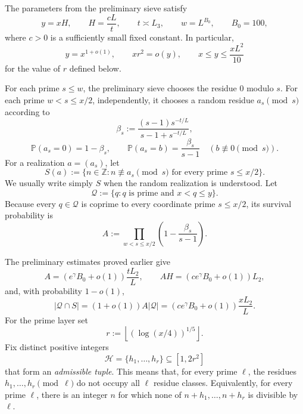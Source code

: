 \documentclass[10pt,letterpaper]{article}
\newcommand{\PP}{\mathbb{P}}
\newcommand{\ZZ}{\mathbb{Z}}
\newcommand{\HH}{\mathcal{H}}
\newcommand{\QQ}{\mathcal{Q}}
\begin{document}
The parameters from the preliminary sieve satisfy
\begin{equation}
y=xH,\qquad H=\frac{cL}{t},\qquad t\asymp L_3,\qquad w=L^{B_0},\qquad B_0=100,
\tag{6.2}
\end{equation}
where $c>0$ is a sufficiently small fixed constant. In particular,
\begin{equation}
y=x^{1+o(1)},\qquad xr^2=o(y),\qquad x\le y\le\frac{xL^2}{10}
\tag{6.3}
\end{equation}
for the value of $r$ defined below.

For each prime $s\le w$, the preliminary sieve chooses the residue $0$ modulo $s$. For each prime $w<s\le x/2$,
independently, it chooses a random residue $a_s\pmod s$ according to
\begin{equation}
\beta_s:=\frac{(s-1)s^{-t/L}}{s-1+s^{-t/L}},
\tag{6.4}
\end{equation}
\begin{equation}
\PP(a_s=0)=1-\beta_s,\qquad
\PP(a_s=b)=\frac{\beta_s}{s-1}\quad(b\not\equiv0\pmod s).
\tag{6.5}
\end{equation}
For a realization $a=(a_s)$, let
\begin{equation}
S(a):=\{n\in\ZZ:n\not\equiv a_s\pmod s\text{ for every prime }s\le x/2\}.
\tag{6.6}
\end{equation}
We usually write simply $S$ when the random realization is understood. Let
\begin{equation}
\QQ:=\{q:q\text{ is prime and }x<q\le y\}.
\tag{6.7}
\end{equation}
Because every $q\in\QQ$ is coprime to every coordinate prime $s\le x/2$, its survival probability is
\begin{equation}
A:=\prod_{w<s\le x/2}\left(1-\frac{\beta_s}{s-1}\right).
\tag{6.8}
\end{equation}

The preliminary estimates proved earlier give
\begin{equation}
A=(e^\gamma B_0+o(1))\frac{tL_2}{L},\qquad
AH=(ce^\gamma B_0+o(1))L_2,
\tag{6.9}
\end{equation}
and, with probability $1-o(1)$,
\begin{equation}
|\QQ\cap S|=(1+o(1))A|\QQ|=(ce^\gamma B_0+o(1))\frac{xL_2}{L}.
\tag{6.10}
\end{equation}
For the prime layer set
\begin{equation}
r:=\left\lfloor(\log(x/4))^{1/5}\right\rfloor.
\tag{6.11}
\end{equation}
Fix distinct positive integers
\begin{equation}
\HH=\{h_1,\ldots,h_r\}\subseteq[1,2r^2]
\tag{6.12}
\end{equation}
that form an \emph{admissible tuple}. This means that, for every prime $\ell$, the residues $h_1,\ldots,h_r\pmod\ell$ do
not occupy all $\ell$ residue classes. Equivalently, for every prime $\ell$, there is an integer $n$ for which none of
$n+h_1,\ldots,n+h_r$ is divisible by $\ell$.
\end{document}
